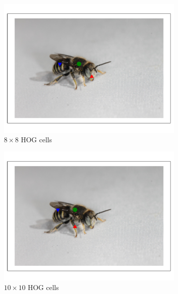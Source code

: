 \documentclass[11pt, oneside]{report}
\begin{document}
\begin{figure}[p]
\begin{subfigure}[b]{0.3\textwidth}
                \includegraphics[width=\textwidth]{hog8_1.pdf}
                \caption{$8\times8$ HOG cells}
            \end{subfigure}
            \begin{subfigure}[b]{0.3\textwidth}
                \centering
                \includegraphics[width=\textwidth]{hog10_1.pdf}
                \caption{$10\times10$ HOG cells}
            \end{subfigure}
            \begin{subfigure}[b]{0.3\textwidth}
                \centering

\end{subfigure}
\end{figure}
\end{document}
